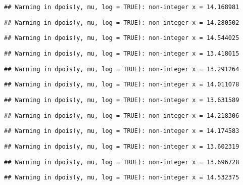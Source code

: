 \documentclass[
]{article}
\begin{document}
\begin{verbatim}
## Warning in dpois(y, mu, log = TRUE): non-integer x = 14.168981
\end{verbatim}

\begin{verbatim}
## Warning in dpois(y, mu, log = TRUE): non-integer x = 14.280502
\end{verbatim}

\begin{verbatim}
## Warning in dpois(y, mu, log = TRUE): non-integer x = 14.544025
\end{verbatim}

\begin{verbatim}
## Warning in dpois(y, mu, log = TRUE): non-integer x = 13.418015
\end{verbatim}

\begin{verbatim}
## Warning in dpois(y, mu, log = TRUE): non-integer x = 13.291264
\end{verbatim}

\begin{verbatim}
## Warning in dpois(y, mu, log = TRUE): non-integer x = 14.011078
\end{verbatim}

\begin{verbatim}
## Warning in dpois(y, mu, log = TRUE): non-integer x = 13.631589
\end{verbatim}

\begin{verbatim}
## Warning in dpois(y, mu, log = TRUE): non-integer x = 14.218306
\end{verbatim}

\begin{verbatim}
## Warning in dpois(y, mu, log = TRUE): non-integer x = 14.174583
\end{verbatim}

\begin{verbatim}
## Warning in dpois(y, mu, log = TRUE): non-integer x = 13.602319
\end{verbatim}

\begin{verbatim}
## Warning in dpois(y, mu, log = TRUE): non-integer x = 13.696728
\end{verbatim}

\begin{verbatim}
## Warning in dpois(y, mu, log = TRUE): non-integer x = 14.532375
\end{verbatim}
\end{document}
